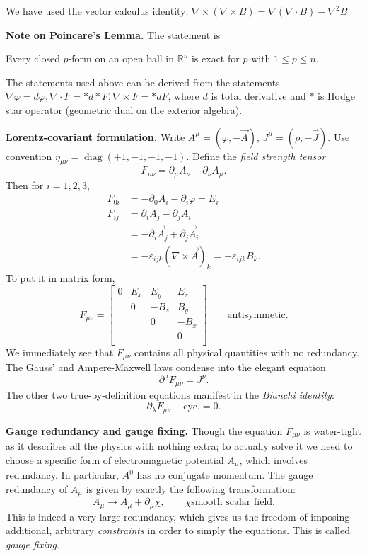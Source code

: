 We have used the vector calculus identity: $\nabla  \times (\nabla  \times B) = \nabla (\nabla \cdot B) - \nabla ^2 B$.

\textbf{Note on Poincare's Lemma.} The statement is
\begin{lemma}
	\label{lem:Poincare}
	Every closed $p$-form on an open ball in $\mathbb{R}^n$ is exact for $p$ with $1 ≤ p ≤ n$.
\end{lemma}
The statements used above can be derived from the statements $\nabla  \varphi = d \varphi, \nabla \cdot F = * d * F, \nabla \times F = * d F$, where $d$ is total derivative and $*$ is Hodge star operator (geometric dual on the exterior algebra).

\textbf{Lorentz-covariant formulation.}
Write $A^\mu = (\varphi, - \vec{A} )$, $J^\mu = \left( \rho, - \vec{J}  \right) $. Use convention $\eta_{\mu \nu} = \operatorname{diag} \left( +1, -1, -1, -1 \right) $. 
Define the \textit{field strength tensor}
\[
	F_{\mu \nu} = \partial_ \mu A_ \nu - \partial_\nu A_\mu
.\] 
Then for $i = 1, 2, 3$,
\begin{align*}
	F_{0 i} &= - \partial_0 A_i - \partial_i \varphi = E_i\\
	F_{i j} &= \partial_i A_j - \partial_j A_i \\
	&= - \partial_i \vec{A} _j + \partial_j \vec{A} _i \\
	&= - \varepsilon_{i j k} \left( \nabla \times \vec{A}  \right) _k = - \varepsilon_{i j k} B_k
.\end{align*}
To put it in matrix form,
\[
	F_{\mu \nu} =
	\begin{bmatrix}
		0 & E_x & E_y & E_z \\
		 & 0 & -B_z & B_y \\
		 &  & 0 & -B_x \\
		 &  &  & 0 \\
	\end{bmatrix}
\qquad \text{antisymmetic}
.\] 
We immediately see that $F_{\mu \nu}$ contains all physical quantities with no redundancy. The Gauss' and Ampere-Maxwell laws condense into the elegant equation
\[
	\partial^ \mu F_{\mu \nu} = J^\nu
.\] 
The other two true-by-definition equations manifest in the \textit{Bianchi identity}:
\[
	\partial_\lambda F_{\mu \nu} + \text{cyc.} = 0
.\]

\textbf{Gauge redundancy and gauge fixing.}
Though the equation $F_{\mu \nu}$ is water-tight as it describes all the physics with nothing extra; to actually solve it we need to choose a specific form of electromagnetic potential $A_\mu$, which involves redundancy. In particular, $A^0$ has no conjugate momentum. The gauge redundancy of $A_\mu$ is given by exactly the following transformation:
\[
	A_ \mu \to A_ \mu + \partial_ \mu \chi, \qquad \chi \text{smooth scalar field}
.\] 
This is indeed a very large redundancy, which gives us the freedom of imposing additional, arbitrary \textit{constraints} in order to simply the equations. This is called \textit{gauge fixing}.

